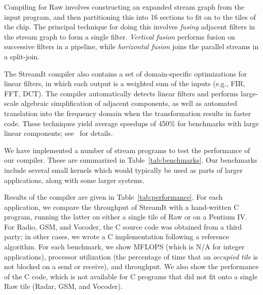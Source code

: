 Compiling for Raw involves constructing an expanded stream graph from
the input program, and then partitioning this into 16 sections to fit
on to the tiles of the chip\cite{gordon02}.  The principal technique
for doing this involves \emph{fusing} adjacent filters in the stream
graph to form a single filter.  \emph{Vertical fusion} performs fusion
on successive filters in a pipeline, while \emph{horizontal fusion}
joins the parallel streams in a split-join.


The StreamIt compiler also contains a set of domain-specific
optimizations for linear filters, in which each output is a weighted
sum of the inputs (e.g., FIR, FFT, DCT). The compiler automatically
detects linear filters and performs large-scale algebraic
simplification of adjacent components, as well as automated
translation into the frequency domain when the transformation results
in faster code.  These techniques yield average speedups of 450\% for
benchmarks with large linear components; see~\cite{lamb03} for
details.

We have implemented a number of stream programs to test the
performance of our compiler.  These are summarized in
Table~\ref{tab:benchmarks}.  Our benchmarks include several small
kernels which would typically be used as parts of larger applications,
along with some larger systems.

Results of the compiler are given in Table~\ref{tab:performance}.
For each application, we compare the throughput of StreamIt with a
hand-written C program, running the latter on either a single tile of
Raw or on a Pentium IV.  For Radio, GSM, and Vocoder, the C source
code was obtained from a third party; in other cases, we wrote a C
implementation following a reference algorithm.  For each benchmark,
we show MFLOPS (which is N/A for integer applications), processor
utilization (the percentage of time that an {\it occupied tile} is not
blocked on a send or receive), and throughput.  We also show the
performance of the C code, which is not available for C programs that
did not fit onto a single Raw tile (Radar, GSM, and Vocoder).

